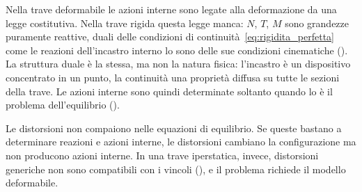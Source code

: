 \begin{oss}\label{oss:azioni_interne_reattive}
	Nella trave deformabile le azioni interne sono legate
	alla deformazione da una legge costitutiva. Nella trave
	rigida questa legge manca: $N$, $T$, $M$ sono grandezze
	puramente reattive, duali delle condizioni di
	continuità~\eqref{eq:rigidita_perfetta} come le reazioni
	dell'incastro interno lo sono delle sue condizioni
	cinematiche (). La struttura
	duale è la stessa, ma non la natura fisica: l'incastro
	è un dispositivo concentrato in un punto, la continuità
	una proprietà diffusa su tutte le sezioni della trave.
	Le azioni interne sono quindi determinate soltanto quando lo è il problema
	dell'equilibrio ().
\end{oss}

\begin{oss}\label{oss:distorsione_isostatica}
	Le distorsioni non compaiono nelle equazioni di
	equilibrio. Se queste bastano a determinare reazioni
	e azioni interne, le distorsioni cambiano la
	configurazione ma non producono azioni interne. In una
	trave iperstatica, invece, distorsioni generiche non
	sono compatibili con i vincoli
	(), e il problema richiede
	il modello deformabile.
\end{oss}



